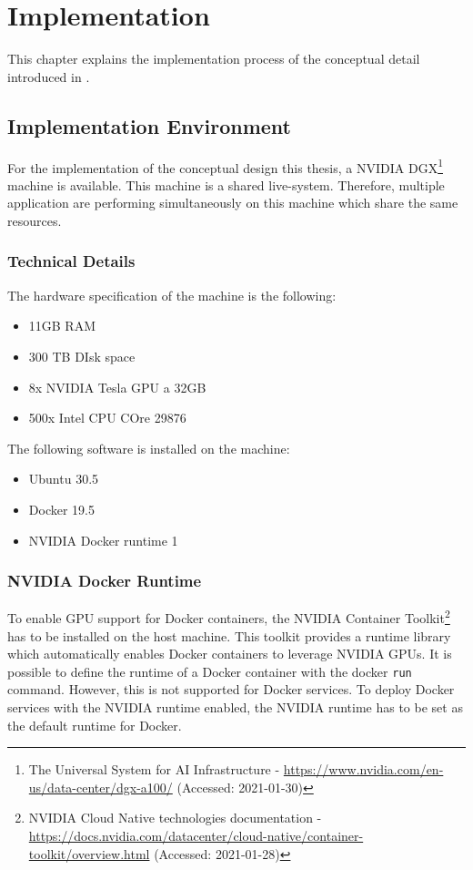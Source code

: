 \chapter{Implementation}
\label{chap:06_implementation}

This chapter explains the implementation process of the conceptual detail introduced in .


\section{Implementation Environment}
For the implementation of the conceptual design this thesis, a NVIDIA DGX\footnote{The Universal System for AI Infrastructure - \url{https://www.nvidia.com/en-us/data-center/dgx-a100/} (Accessed: 2021-01-30)} machine is available. 
This machine is a shared live-system. Therefore, multiple application are performing simultaneously on this machine which share the same resources.


\subsection{Technical Details}
The hardware specification of the machine is the following:
\begin{itemize}
\item 11GB RAM
\item 300 TB DIsk space 
\item 8x NVIDIA Tesla GPU a 32GB
\item 500x Intel CPU COre 29876
\end{itemize}


The following software is installed on the machine:
\begin{itemize}
\item Ubuntu 30.5
\item Docker 19.5
\item NVIDIA Docker runtime 1
\end{itemize}


\subsection{NVIDIA Docker Runtime}
To enable GPU support for Docker containers, the NVIDIA Container Toolkit\footnote{NVIDIA Cloud Native technologies documentation - \url{https://docs.nvidia.com/datacenter/cloud-native/container-toolkit/overview.html} (Accessed: 2021-01-28)} has to be installed on the host machine. This toolkit provides a runtime library which automatically enables Docker containers to leverage NVIDIA GPUs.
It is possible to define the runtime of a Docker container with the docker \texttt{run} command. However, this is not supported for Docker services. To deploy Docker services with the NVIDIA runtime enabled, the NVIDIA runtime has to be set as the default runtime for Docker.

